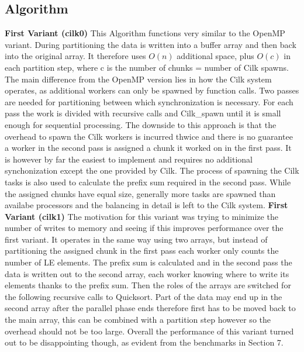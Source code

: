 \documentclass[12pt,a4paper]{article}
\begin{document}
\subsection{Algorithm}
\textbf{First Variant (cilk0)}\newline
This Algorithm functions very similar to the OpenMP variant. During partitioning the data is written into a buffer array and then back into the original array. It therefore uses $O(n)$ additional space, plus $O(c)$ in each partition step, where c is the number of chunks = number of Cilk spawns. 
The main difference from the OpenMP version lies in how the Cilk system operates, as additional workers can only be spawned by function calls. Two passes are needed for partitioning between which synchronization is necessary. For each pass the work is divided with recursive calls and Cilk\_spawn until it is small enough for sequential processing. The downside to this approach is that the overhead to spawn the Cilk workers is incurred thwice and there is no guarantee a worker in the second pass is assigned a chunk it worked on in the first pass. It is however by far the easiest to implement and requires no additional synchonization except the one provided by Cilk. The process of spawning the Cilk tasks is also used to calculate the prefix sum required in the second pass. While the assigned chunks have equal size, generally more tasks are spawned than availabe processors and the balancing in detail is left to the Cilk system.
\newline\newline
\textbf{First Variant (cilk1)}\newline
The motivation for this variant was trying to minimize the number of writes to memory and seeing if this improves performance over the first variant. It operates in the same way using two arrays, but instead of partitioning the assigned chunk in the first pass each worker only counts the number of LE elements. The prefix sum is calculated and in the second pass the data is written out to the second array, each worker knowing where to write its elements thanks to the prefix sum. 
Then the roles of the arrays are switched for the following recursive calls to Quicksort. Part of the data may end up in the second array after the parallel phase ends therefore first has to be moved back to the main array, this can be combined with a partition step however so the overhead should not be too large. Overall the performance of this variant turned out to be disappointing though, as evident from the benchmarks in Section 7.
\newline\newline
\end{document}
